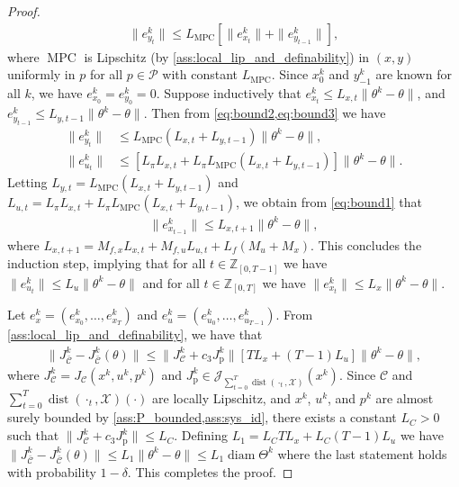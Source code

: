 \documentclass[journal,twoside,web,final]{ieeecolor}
\theoremstyle{definition}
\newcommand{\Z}{\mathbb{Z}}
\newcommand{\J}{\mathcal{J}}
\newcommand{\Cb}{{\bar{\mathcal{C}}}}
\begin{document}
\begin{proof}
\begin{align}
\|e_{y_t}^k\| \leq L_\text{MPC} [ \| e_{x_t}^k \| + \| e_{y_{t-1}}^k \| ], \label{eq:bound3}
\end{align}
where $\operatorname*{MPC}$ is Lipschitz (by \cref{ass:local_lip_and_definability}) in $(x,y)$ uniformly in $p$ for all $p\in \mathcal{P}$ with constant $L_\text{MPC}$. 
Since $x_0^k$ and $y_{-1}^k$ are known for all $k$, we have $e_{x_0}^k=e_{y_0}^k=0$. Suppose inductively that $e_{x_t}^k \leq L_{x,t} \|\theta^k-\theta\|$, and $e_{y_{t-1}}^k \leq L_{y,t-1} \|\theta^k-\theta\|$. Then from \cref{eq:bound2,eq:bound3} we have
\begin{align*}
\|e_{y_t}^k\| & \leq L_\text{MPC} ( L_{x,t} + L_{y,t-1} ) \| \theta^k-\theta \|,\\
\|e_{u_t}^k\| & \leq [ L_\pi L_{x,t} + L_\pi L_\text{MPC} (L_{x,t} + L_{y,t-1}) ] \| \theta^k-\theta \|.
\end{align*}
Letting $L_{y,t}=L_\text{MPC} ( L_{x,t} + L_{y,t-1} )$ and $L_{u,t}=L_\pi L_{x,t} + L_\pi L_\text{MPC} (L_{x,t} + L_{y,t-1})$, we obtain from \cref{eq:bound1} that
\begin{align*}
\|e_{x_{t-1}}^k\| \leq L_{x,{t+1}} \|\theta^k-\theta\|,
\end{align*}
where $L_{x,t+1}=M_{f,x} L_{x,t} + M_{f,u} L_{u,t} + L_f(M_u+M_x)$. This concludes the induction step, implying that for all $t\in\Z_{[0,T-1]}$ we have $\|e_{u_t}^k\| \leq L_u \|\theta^k-\theta\|$ and for all $t\in\Z_{[0,T]}$ we have $\|e_{x_t}^k\| \leq L_x \|\theta^k-\theta\|$.

Let $e_{x}^k=(e_{x_0}^k,\dots,e_{x_T}^k)$ and $e_u^k=(e_{u_0}^k,\dots,e_{u_{T-1}}^k)$. From \cref{ass:local_lip_and_definability}, we have that
\begin{align*}
\|J_\Cb^k-J_\Cb^k(\theta)\| \leq \|J_{\mathcal{C}}^k + c_3J_\text{p}^k\| [ T L_x + (T-1) L_u ] \|\theta^k-\theta\|,
\end{align*}
where $J_\mathcal{C}^k=J_{\mathcal{C}}(x^k,u^k,p^k)$ and $J_\text{p}^k\in\J_{\sum_{t=0}^{T} \operatorname*{dist}(\cdot_t,\mathcal{X})}(x^k)$. 
Since $\mathcal{C}$ and $\sum_{t=0}^{T} \operatorname*{dist}(\cdot_t,\mathcal{X})(\cdot)$ are locally Lipschitz, and $x^k$, $u^k$, and $p^k$ are almost surely bounded by \cref{ass:P_bounded,ass:sys_id}, there exists a constant $ L_C>0 $ such that $\|J_{\mathcal{C}}^k + c_3J_\text{p}^k\| \leq L_C$. Defining $L_1=L_CTL_x+L_C(T-1)L_u$ we have $\|J_\Cb^k-J_\Cb^k(\theta)\| \leq L_1 \|\theta^k-\theta\| \leq L_1 \operatorname*{diam}\Theta^k$ where the last statement holds with probability $1-\delta$. This completes the proof.
\end{proof}
%
\end{document}
